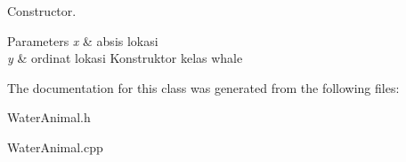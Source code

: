 Constructor. 


\begin{DoxyParams}{Parameters}
{\em x} & absis lokasi \\
\hline
{\em y} & ordinat lokasi Konstruktor kelas whale \\
\hline
\end{DoxyParams}


The documentation for this class was generated from the following files\+:\begin{DoxyCompactItemize}
\item 
Water\+Animal.\+h\item 
Water\+Animal.\+cpp\end{DoxyCompactItemize}
